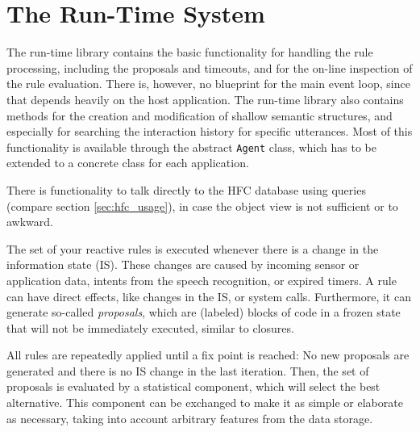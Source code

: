 \section{The Run-Time System}

The run-time library contains the basic functionality for handling the rule
processing, including the proposals and timeouts, and for the on-line
inspection of the rule evaluation. There is, however, no blueprint for the main
event loop, since that depends heavily on the host application. The run-time library also
contains methods for the creation and modification of shallow semantic
structures, and especially for searching the interaction history for specific
utterances. Most of this functionality is available through the abstract
\texttt{Agent} class, which has to be extended to a concrete class for each
application.

There is functionality to talk directly to the HFC database using queries (compare section \ref{sec:hfc_usage}), in
case the object view is not sufficient or to awkward.

The set of your reactive \vonda rules is executed whenever there is a change in the
information state (IS). These changes are caused by incoming sensor or
application data, intents from the speech recognition, or expired timers.
A rule can have direct effects,
like changes in the IS, or system calls. Furthermore, it can generate so-called
\emph{proposals}, which are (labeled) blocks of code in a frozen state that
will not be immediately executed, similar to closures.

All rules are repeatedly applied until a fix point is reached: No new proposals
are generated and there is no IS change in the last iteration. Then, the set of
proposals is evaluated by a statistical component, which will select the best
alternative. This component can be exchanged to make it as simple or elaborate
as necessary, taking into account arbitrary features from the data storage.

